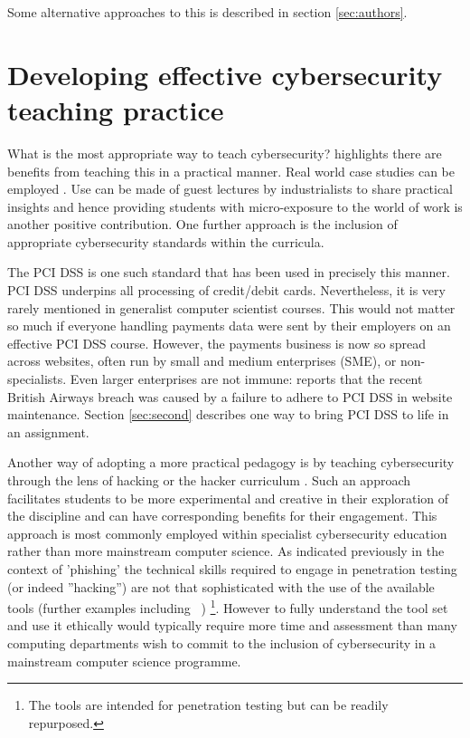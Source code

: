 \documentclass[conference]{IEEEtran}
\begin{document}
Some alternative approaches to this is described in section \ref{sec:authors}.

\section{Developing effective cybersecurity teaching practice}\label{practice}

What is the most appropriate way to teach cybersecurity? \cite{Weiss:2013:THC:2527148.2527180} highlights there are benefits from teaching this in a practical manner. Real world case studies can be employed \cite[e.g.]{BritishAirways2018a,Zoom2020a}. Use can be made of guest lectures by industrialists to share practical insights and hence providing students with micro-exposure to the world of work is another positive contribution. One further approach is the inclusion of appropriate cybersecurity standards within the curricula.

The PCI DSS \cite{PCI2018b} is one such standard that has been used in precisely this manner. PCI DSS underpins all processing of credit/debit cards. Nevertheless, it is very rarely mentioned in generalist computer scientist courses. This would not matter so much if everyone handling payments data were sent by their employers on an effective PCI DSS course. However, the payments business is now so spread across websites, often run by small and medium enterprises (SME), or non-specialists. Even larger enterprises are not immune: \cite{BritishAirways2018a} reports that the recent British Airways breach was caused by a failure to adhere to PCI DSS in website maintenance. Section \ref{sec:second} describes one way to bring PCI DSS to life in an assignment.

Another way of adopting a more practical pedagogy is by teaching cybersecurity through the lens of hacking or the hacker curriculum \cite{bratus2010teaching}. Such an approach facilitates students to be more experimental and creative in their exploration of the discipline and can have corresponding benefits for their engagement. This approach is most commonly employed within specialist cybersecurity education rather than more mainstream computer science. As indicated previously in the context of 'phishing' the technical skills required to engage in penetration testing (or indeed ''hacking'') are not that sophisticated with the use of the available tools (further examples including ~\cite{KaliLinux,metasploit}) \footnote{The tools are intended for penetration testing but can be readily repurposed. }. However to fully understand the tool set and use it ethically would typically require more time and assessment than many computing departments wish to commit to the inclusion of cybersecurity in a mainstream computer science programme.
\end{document}
